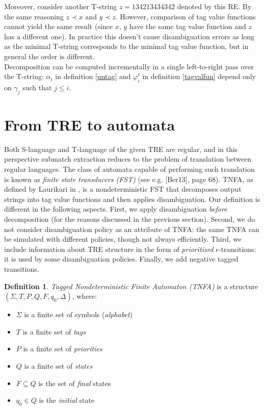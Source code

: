 \documentclass{article}
\newcommand{\Xeq}{\!=\!}
\theoremstyle{definition}
\newtheorem{Xdef}{Definition}
\begin{document}
\begin{multicols}{2}
Moreover, consider another T-string $z \Xeq 1 3 4 2 1 3 4 3 4 3 4 2$ denoted by this RE.
By the same reasoning $z \prec x$ and $y \prec z$.
However, comparison of tag value functions cannot yield the same result
(since $x$, $y$ have the same tag value function and $z$ has a different one).
In practice this doesn't cause disambiguation errors
as long as the minimal T-string corresponds to the minimal tag value function,
but in general the order is different.
\\

Decomposition can be computed incrementally in a single left-to-right pass over the T-string:
$\alpha_i$ in definition \ref{untag} and
$\varphi_i^t$ in definition \ref{tagvalfun} depend only on $\gamma_j$ such that $j \!\leq\! i$.

\section{From TRE to automata}\label{section_tnfa}

Both S-language and T-language of the given TRE are regular,
and in this perspective submatch extraction reduces to the problem of translation between regular languages.
The class of automata capable of performing such translation is known as \emph{finite state transducers (FST)} (see e.g. [Ber13], page 68).
TNFA, as defined by Laurikari in \cite{Lau01}, is a nondeterministic FST
that decomposes output strings into tag value functions
and then applies disambiguation.
Our definition is different in the following aspects.
First, we apply disambiguation \emph{before} decomposition
(for the reasons discussed in the previous section).
Second, we do not consider disambiguation policy as an attribute of TNFA:
the same TNFA can be simulated with different policies, though not always efficiently.
Third, we include information about TRE structure in the form of \emph{prioritized} $\epsilon$-transitions:
it is used by some disambiguation policies.
Finally, we add negative tagged transitions.

    \begin{Xdef}
    \emph{Tagged Nondeterministic Finite Automaton (TNFA)}
    is a structure $(\Sigma, T, P, Q, F, q_0, \Delta)$, where:
    \begin{itemize}
    \setlength{\parskip}{0.5em}
        \item[] $\Sigma$ is a finite set of symbols (\emph{alphabet})
        \item[] $T$ is a finite set of \emph{tags}
        \item[] $P$ is a finite set of \emph{priorities}
        \item[] $Q$ is a finite set of \emph{states}
        \item[] $F \subseteq Q$ is the set of \emph{final} states
        \item[] $q_0 \in Q$ is the \emph{initial} state


\end{itemize}
\end{Xdef}
\end{multicols}
\end{document}
